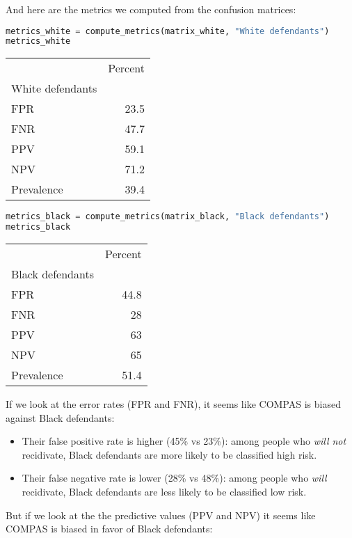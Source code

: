 And here are the metrics we computed from the confusion matrices:

\begin{lstlisting}[language=Python,style=source]
metrics_white = compute_metrics(matrix_white, "White defendants")
metrics_white
\end{lstlisting}

\begin{tabular}{lr}
\toprule
 & Percent \\
White defendants &  \\
\midrule
FPR & 23.5 \\
FNR & 47.7 \\
PPV & 59.1 \\
NPV & 71.2 \\
Prevalence & 39.4 \\
\bottomrule
\end{tabular}

\begin{lstlisting}[language=Python,style=source]
metrics_black = compute_metrics(matrix_black, "Black defendants")
metrics_black
\end{lstlisting}

\begin{tabular}{lr}
\toprule
 & Percent \\
Black defendants &  \\
\midrule
FPR & 44.8 \\
FNR & 28 \\
PPV & 63 \\
NPV & 65 \\
Prevalence & 51.4 \\
\bottomrule
\end{tabular}

If we look at the error rates (FPR and FNR), it seems like COMPAS is
biased against Black defendants:

\begin{itemize}
\item
  Their false positive rate is higher (45\% vs 23\%): among people who
  \emph{will not} recidivate, Black defendants are more likely to be
  classified high risk.
\item
  Their false negative rate is lower (28\% vs 48\%): among people who
  \emph{will} recidivate, Black defendants are less likely to be
  classified low risk.
\end{itemize}

But if we look at the the predictive values (PPV and NPV) it seems like
COMPAS is biased in favor of Black defendants:

